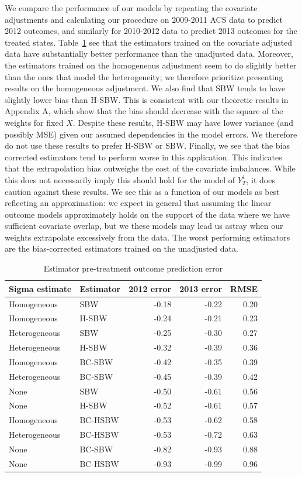 We compare the performance of our models by repeating the covariate adjustments and calculating our procedure on 2009-2011 ACS data to predict 2012 outcomes, and similarly for 2010-2012 data to predict 2013 outcomes for the treated states. Table~\ref{tab:pretxpred} see that the estimators trained on the covariate adjusted data have substantially better performance than the unadjusted data. Moreover, the estimators trained on the homogeneous adjustment seem to do slightly better than the ones that model the heterogeneity; we therefore prioritize presenting results on the homogeneous adjustment. We also find that SBW tends to have slightly lower bias than H-SBW. This is consistent with our theoretic results in Appendix A, which show that the bias should decrease with the square of the weights for fixed $X$. Despite these results, H-SBW may have lower variance (and possibly MSE) given our assumed dependencies in the model errors. We therefore do not use these results to prefer H-SBW or SBW. Finally, we see that the bias corrected estimators tend to perform worse in this application. This indicates that the extrapolation bias outweighs the cost of the covariate imbalances. While this does not necessarily imply this should hold for the model of $Y^1_T$, it does caution against these results. We see this as a function of our models as best reflecting an approximation: we expect in general that assuming the linear outcome models approximately holds on the support of the data where we have sufficient covariate overlap, but we these models may lead us astray when our weights extrapolate excessively from the data. The worst performing estimators are the bias-corrected estimators trained on the unadjusted data.

\begin{table}[ht]
\caption{Estimator pre-treatment outcome prediction error}
\label{tab:pretxpred}
\begin{tabular}{llrrr}
  \hline
Sigma estimate & Estimator & 2012 error & 2013 error & RMSE \\ 
  \hline
Homogeneous & SBW & -0.18 & -0.22 & 0.20 \\ 
  Homogeneous & H-SBW & -0.24 & -0.21 & 0.23 \\ 
  Heterogeneous & SBW & -0.25 & -0.30 & 0.27 \\ 
  Heterogeneous & H-SBW & -0.32 & -0.39 & 0.36 \\ 
  Homogeneous & BC-SBW & -0.42 & -0.35 & 0.39 \\ 
  Heterogeneous & BC-SBW & -0.45 & -0.39 & 0.42 \\ 
  None & SBW & -0.50 & -0.61 & 0.56 \\ 
  None & H-SBW & -0.52 & -0.61 & 0.57 \\ 
  Homogeneous & BC-HSBW & -0.53 & -0.62 & 0.58 \\ 
  Heterogeneous & BC-HSBW & -0.53 & -0.72 & 0.63 \\ 
  None & BC-SBW & -0.82 & -0.93 & 0.88 \\ 
  None & BC-HSBW & -0.93 & -0.99 & 0.96 \\ 
   \hline
\end{tabular}
\end{table}

